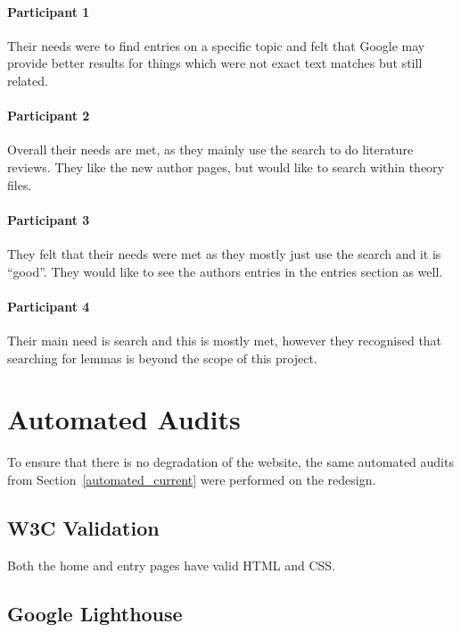 \documentclass[bsc,frontabs,oneside,singlespacing,parskip,deptreport,logo]{infthesis}
\begin{document}
\paragraph*{Participant 1}

Their needs were to find entries on a specific topic and felt that Google may provide better results for things which were not exact text matches but still related.

\paragraph*{Participant 2}

Overall their needs are met, as they mainly use the search to do literature reviews. They like the new author pages, but would like to search within theory files.

\paragraph*{Participant 3}

They felt that their needs were met as they mostly just use the search and it is ``good''. They would like to see the authors entries in the entries section as well.

\paragraph*{Participant 4}

Their main need is search and this is mostly met, however they recognised that searching for lemmas  is beyond the scope of this project.

\section{Automated Audits}
\cbstart
To ensure that there is no degradation of the website, the same automated audits from Section~\ref{automated_current} were performed on the redesign.

\subsection{W3C Validation}

Both the home and entry pages have valid HTML and CSS\@.

\subsection{Google Lighthouse} \label{sec:lighthouse-redesign}
\end{document}
